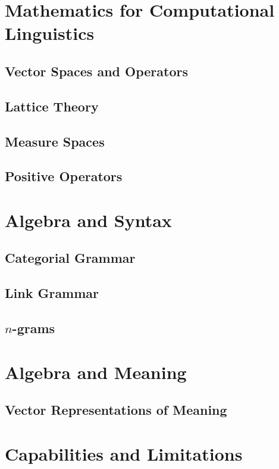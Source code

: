 \documentclass[a4paper,oneside,12pt]{report}
\begin{document}
\chapter{Mathematics for Computational Linguistics}

\section{Vector Spaces and Operators}

\section{Lattice Theory}

\section{Measure Spaces}

\section{Positive Operators}

\chapter{Algebra and Syntax}

\section{Categorial Grammar}

\section{Link Grammar}

\section{$n$-grams}

\chapter{Algebra and Meaning}

\section{Vector Representations of Meaning}

\chapter{Capabilities and Limitations}
\end{document}
